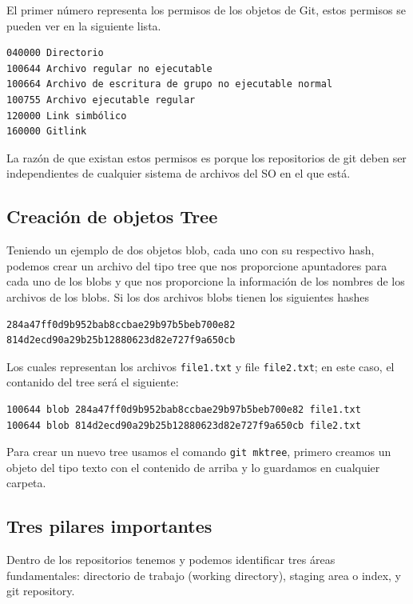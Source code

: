 El primer número representa los permisos de los objetos de Git, estos permisos se pueden ver en la siguiente lista.

\begin{verbatim}
040000 Directorio
100644 Archivo regular no ejecutable
100664 Archivo de escritura de grupo no ejecutable normal
100755 Archivo ejecutable regular
120000 Link simbólico
160000 Gitlink
\end{verbatim}

La razón de que existan estos permisos es porque los repositorios de git deben ser independientes de cualquier sistema de archivos del SO en el que está.

\subsection{Creación de objetos Tree}

Teniendo un ejemplo de dos objetos blob, cada uno con su respectivo hash, podemos crear un archivo del tipo tree que nos proporcione apuntadores para cada uno de los blobs y que nos proporcione la información de los nombres de los archivos de los blobs. Si los dos archivos blobs tienen los siguientes hashes 

\begin{verbatim}
284a47ff0d9b952bab8ccbae29b97b5beb700e82
814d2ecd90a29b25b12880623d82e727f9a650cb
\end{verbatim}

Los cuales representan los archivos \texttt{file1.txt} y file \texttt{file2.txt}; en este caso, el contanido del tree será el siguiente:

\begin{verbatim}
100644 blob 284a47ff0d9b952bab8ccbae29b97b5beb700e82 file1.txt
100644 blob 814d2ecd90a29b25b12880623d82e727f9a650cb file2.txt
\end{verbatim}

Para crear un nuevo tree usamos el comando \texttt{git mktree}, primero creamos un objeto del tipo texto con el contenido de arriba y lo guardamos en cualquier carpeta. 

\subsection{Tres pilares importantes}

Dentro de los repositorios tenemos y podemos identificar tres áreas fundamentales: directorio de trabajo (working directory), staging area o index, y git repository. 


